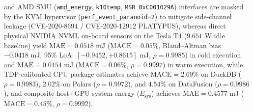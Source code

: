 \documentclass[10pt,a4paper]{article}
\begin{document}
and AMD SMU (\texttt{amd\_energy}, \texttt{k10temp}, \texttt{MSR 0xC001029A}) interfaces are masked by the KVM hypervisor (\texttt{perf\_event\_paranoid=2}) to mitigate side-channel leakage (CVE-2020-8694 / CVE-2020-12912 PLATYPUS), whereas direct physical NVIDIA NVML on-board sensors on the Tesla T4 ($9.651\text{ W}$ idle baseline) yield $\text{MAE} = 0.0518\text{ mJ}$ ($\text{MACE} = 0.05\%$, Bland--Altman bias $-0.0418\text{ mJ}$, 95\% LoA: $[-0.9452, +0.8615]\text{ mJ}$, $\rho = 0.9985$) in cold execution and $\text{MAE} = 0.0154\text{ mJ}$ ($\text{MACE} = 0.06\%$, $\rho = 0.9997$) in warm execution, while TDP-calibrated CPU package estimates achieve $\text{MACE} = 2.69\%$ on DuckDB ($\rho = 0.9983$), $2.02\%$ on Polars ($\rho = 0.9972$), and $4.54\%$ on DataFusion ($\rho = 0.9986$), and composite host+GPU system energy ($E_{\text{sys}}$) achieves $\text{MAE} = 0.4577\text{ mJ}$ ($\text{MACE} = 0.45\%$, $\rho = 0.9992$).
\end{document}
